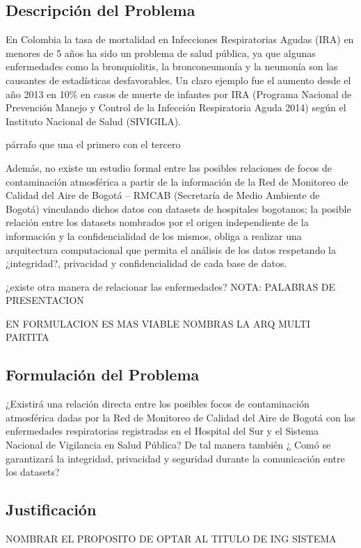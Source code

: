 \documentclass[a4paper, 11pt, oneside]{article}
\theoremstyle{definition}
\theoremstyle{remark}
\begin{document}
\subsection{Descripción del Problema}
En Colombia la tasa de mortalidad en Infecciones Respiratorias Agudas (IRA) en menores de 5 años ha sido un problema de salud pública, ya que algunas enfermedades como la bronquiolitis, la bronconeumonía y la neumonía son las causantes de estadísticas desfavorables. Un claro ejemplo fue el aumento desde el año 2013 en 10\% en casos de muerte de infantes por IRA (Programa Nacional de Prevención Manejo y Control de la Infección Respiratoria Aguda 2014) según el Instituto Nacional de  Salud (SIVIGILA). 

párrafo que una el primero con el tercero

Además, no existe un estudio formal entre las posibles relaciones de focos de contaminación atmosférica a partir de la información de la Red de Monitoreo de Calidad del Aire de Bogotá – RMCAB (Secretaría de Medio Ambiente de Bogotá) vinculando dichos datos con datasets de hospitales bogotanos; la posible relación entre los datasets nombrados por el origen independiente de la información y la confidencialidad de los mismos, obliga a realizar una arquitectura computacional que permita el análisis de los datos respetando la ¿integridad?, privacidad y confidencialidad de cada base de datos.

¿existe otra manera de relacionar las enfermedades?
NOTA: PALABRAS DE PRESENTACION

EN FORMULACION ES MAS VIABLE NOMBRAS LA ARQ MULTI PARTITA

\subsection{Formulación del Problema}
¿Existirá una relación directa entre los posibles focos de contaminación atmosférica dadas por la Red de Monitoreo de Calidad del Aire de Bogotá con las enfermedades respiratorias registradas en el Hospital del Sur y el Sistema Nacional de Vigilancia en Salud Pública? De tal manera también ¿ Comó se garantizará la integridad, privacidad y seguridad durante la comunicación entre los datasets?




\subsection{Justificación}
 NOMBRAR EL PROPOSITO DE OPTAR AL TITULO DE ING SISTEMA
\end{document}
